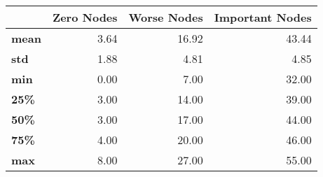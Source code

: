 \begin{tabular}{lrrr}
\toprule
{} &  Zero Nodes &  Worse Nodes &  Important Nodes \\
\midrule
\textbf{mean} &        3.64 &        16.92 &            43.44 \\
\textbf{std } &        1.88 &         4.81 &             4.85 \\
\textbf{min } &        0.00 &         7.00 &            32.00 \\
\textbf{25\% } &        3.00 &        14.00 &            39.00 \\
\textbf{50\% } &        3.00 &        17.00 &            44.00 \\
\textbf{75\% } &        4.00 &        20.00 &            46.00 \\
\textbf{max } &        8.00 &        27.00 &            55.00 \\
\bottomrule
\end{tabular}
